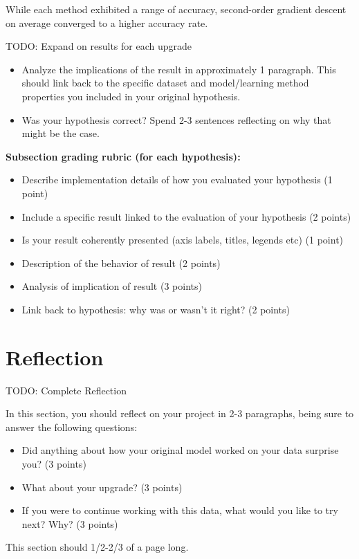 \documentclass[11pt]{extarticle}
\begin{document}
While each method exhibited a range of accuracy, second-order gradient descent on average converged to a higher accuracy rate.

TODO: Expand on results for each upgrade

\begin{itemize}
 \item Analyze the implications of the result in approximately 1 paragraph.  This should link back to the specific dataset and model/learning method properties you included in your original hypothesis.  
 \item Was your hypothesis correct?  Spend 2-3 sentences reflecting on why that might be the case.
\end{itemize}

\textbf{Subsection grading rubric (for each hypothesis):}
\begin{itemize}
	\item Describe implementation details of how you evaluated your hypothesis (1 point)
	\item Include a specific result linked to the evaluation of your hypothesis (2 points)
	\item Is your result coherently presented (axis labels, titles, legends etc) (1 point)
	\item Description of the behavior of result (2 points)
	\item Analysis of implication of result (3 points)
	\item Link back to hypothesis: why was or wasn't it right? (2 points)
\end{itemize}

\newpage

\section{Reflection}

TODO: Complete Reflection

In this section, you should reflect on your project in 2-3 paragraphs, being sure to answer the following questions:
\begin{itemize}
	\item Did anything about how your original model worked on your data surprise you? (3 points)
	\item What about your upgrade? (3 points)
	\item If you were to continue working with this data, what would you like to try next?  Why? (3 points)
\end{itemize}

This section should 1/2-2/3 of a page long.
\end{document}
